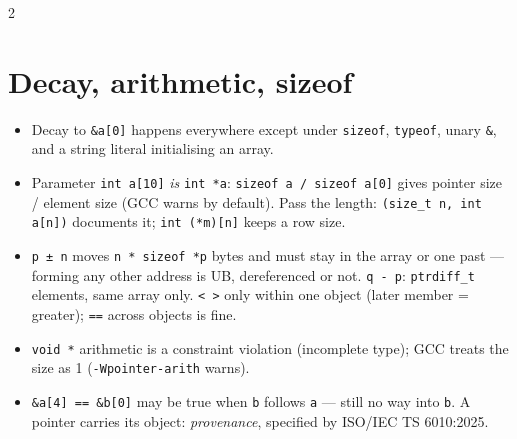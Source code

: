 \documentclass[8pt]{extarticle}
\newcommand\ct[1]{\texttt{#1}}
\begin{document}
\begin{multicols}{2}
\section{Decay, arithmetic, sizeof}
\begin{itemize}
  \item Decay to \ct{\&a[0]} happens everywhere except under \ct{sizeof}, \ct{typeof}, unary
        \ct{\&}, and a string literal initialising an array.
  \item Parameter \ct{int a[10]} \emph{is} \ct{int *a}: \ct{sizeof a / sizeof a[0]} gives
        pointer size / element size (GCC warns by default). Pass the length:
        \ct{(size\_t n, int a[n])} documents it; \ct{int (*m)[n]} keeps a row size.
  \item \ct{p ± n} moves \ct{n * sizeof *p} bytes and must stay in the array or one past —
        forming any other address is UB, dereferenced or not. \ct{q - p}: \ct{ptrdiff\_t}
        elements, same array only. \ct{< >} only within one object (later member = greater);
        \ct{==} across objects is fine.
  \item \ct{void *} arithmetic is a constraint violation (incomplete type); GCC treats the size
        as 1 (\ct{-Wpointer-arith} warns).
  \item \ct{\&a[4] == \&b[0]} may be true when \ct{b} follows \ct{a} — still no way into \ct{b}.
        A pointer carries its object: \emph{provenance}, specified by ISO/IEC TS 6010:2025.
\end{itemize}


\end{multicols}
\end{document}
